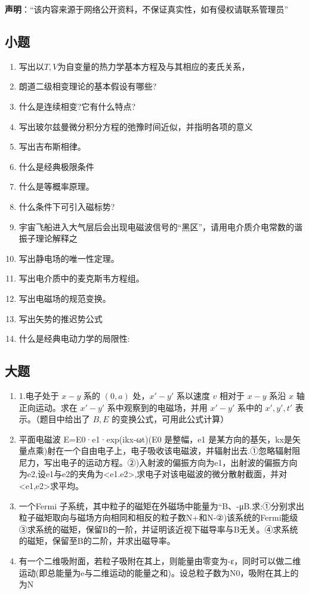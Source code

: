 
\textbf{声明}：“该内容来源于网络公开资料，不保证真实性，如有侵权请联系管理员”
\subsection{小题}
\begin{enumerate}
\item 写出以$T,V$为自变量的热力学基本方程及与其相应的麦氏关系，
\item 朗道二级相变理论的基本假设有哪些?
\item 什么是连续相变?它有什么特点?
\item 写出玻尔兹曼微分积分方程的弛豫时间近似，并指明各项的意义
\item 写出吉布斯相律。
\item 什么是经典极限条件
\item 什么是等概率原理。
\item 什么条件下可引入磁标势?
\item 宇宙飞船进入大气层后会出现电磁波信号的“黑区”，请用电介质介电常数的谐振子理论解释之
\item 写出静电场的唯一性定理。
\item 写出电介质中的麦克斯韦方程组。
\item 写出电磁场的规范变换。
\item 写出矢势的推迟势公式
\item 什么是经典电动力学的局限性:
\end{enumerate}
\subsection{大题}
\begin{enumerate}
\item 1.电子处于 $x-y$ 系的 $(0, a)$ 处，$x'-y'$ 系以速度 $v$ 相对于 $x-y$ 系沿 $x$ 轴正向运动。求在 $x'-y'$ 系中观察到的电磁场，并用 $x'-y'$ 系中的 $x', y', t'$ 表示。（题目中给出了 $B, E$ 的变换公式，可用此公式计算）
\item 平面电磁波 E=E0·e1·exp(ikx-ωt)(E0 是整幅，e1 是某方向的基矢，kx是矢量点乘)射在一个自由电子上，电子吸收该电磁波，并辐射出去.①忽略辐射阻尼力，写出电子的运动方程。②)入射波的偏振方向为e1，出射波的偏振方向为e2,设e1与e2的夹角为<e1.e2>,求电子对该电磁波的微分散射截面，并对<e1,e2>求平均。
\item 一个Fermi 子系统，其中粒子的磁矩在外磁场中能量为“B、-μB.求:①分别求出粒子磁矩取向与磁场方向相同和相反的粒子数N+和N-②)该系统的Fermi能级③求系统的磁矩，保留B的一阶，并证明该近视下磁导率与B无关。④求系统的磁矩，保留至B的二阶，并求出磁导率。
\item 有一个二维吸附面，若粒子吸附在其上，则能量由零变为-ε，同时可以做二维运动(即总能量为e与二维运动的能量之和)。设总粒子数为N0，吸附在其上的为N
\end{enumerate}
